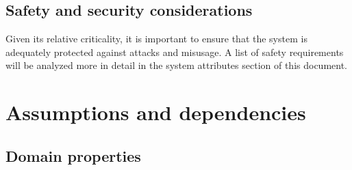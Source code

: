 \subsection{Safety and security considerations}
Given its relative criticality, it is important to ensure that the system is adequately protected against attacks and misusage. A list of safety requirements will be analyzed more in detail in the system attributes section of this document.

\section{Assumptions and dependencies}
\subsection{Domain properties}
